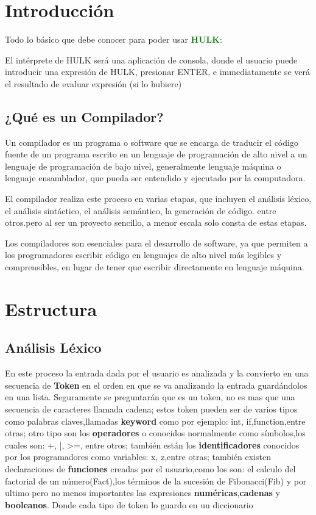 \documentclass[a4paper,12pt]{article}
\begin{document}
	
	\section{\color{violet}Introducción}
	
	\begin{center}
			\large Todo lo básico que debe conocer para poder usar \textbf{\textcolor{green}{HULK}}:
	\end{center}

    El intérprete de HULK será una aplicación de consola, donde el usuario puede introducir una expresión de HULK, presionar ENTER, e immediatamente se verá el resultado de evaluar expresión (si lo hubiere) 
	
	\subsection{¿Qué es un Compilador?}
	Un compilador es un programa o software que se encarga de traducir el código fuente de un programa escrito en un lenguaje de programación de alto nivel a un lenguaje de programación de bajo nivel, generalmente lenguaje máquina o lenguaje ensamblador, que pueda ser entendido y ejecutado por la computadora. 
	
	El compilador realiza este proceso en varias etapas, que incluyen el análisis léxico, el análisis sintáctico, el análisis semántico, la generación de código. entre otros.pero al ser un proyecto sencillo, a menor escala solo consta de estas etapas.
	
	Los compiladores son esenciales para el desarrollo de software, ya que permiten a los programadores escribir código en lenguajes de alto nivel más legibles y comprensibles, en lugar de tener que escribir directamente en lenguaje máquina.
	
	\section{\color{violet}Estructura}
	
	\subsection{Análisis Léxico}
	
	En este proceso la entrada dada por el usuario es analizada y la convierto en una secuencia de \textbf{Token} en el orden en que se va analizando la entrada guardándolos en una lista. Seguramente se preguntarán que es un token, no es mas que una secuencia de caracteres llamada cadena; estos token pueden ser de varios tipos como palabras claves,llamadas \textbf{keyword} como por ejemplo: int, if,function,entre otras; otro tipo son los \textbf{operadores} o conocidos normalmente como símbolos,los cuales son: +, |, >=, entre otros; también están los \textbf{identificadores} conocidos por los programadores como variables: x, z,entre otras; también existen declaraciones de \textbf{funciones} creadas por el usuario,como los son: el calculo del factorial de un número(Fact),los términos de la sucesión de Fibonacci(Fib) y por ultimo pero no menos importantes las expresiones \textbf{numéricas},\textbf{cadenas} y \textbf{booleanos}. Donde cada tipo de token lo guardo en un diccionario
	
\end{document}
